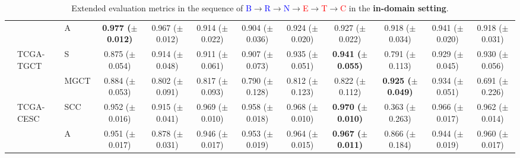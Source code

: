 \documentclass[10pt,twocolumn,letterpaper]{article}
\begin{document}
\begin{table}[h]
{{\begin{tabular}{lllcc|ccccc|cc}
          &            & A                   & \textbf{0.977 ($\pm$0.012)}  & 0.967 ($\pm$0.012)           & 0.914 ($\pm$0.022)        & 0.904 ($\pm$0.036)          & 0.924 ($\pm$0.020)          & 0.927 ($\pm$0.022)          & 0.918 ($\pm$0.034)          & 0.941 ($\pm$0.020)        & 0.918 ($\pm$0.031)        \\
          & TCGA-TGCT  & S & 0.875 ($\pm$0.054)           & 0.914 ($\pm$0.048)           & 0.911 ($\pm$0.061)        & 0.907 ($\pm$0.073)          & 0.935 ($\pm$0.051)          & \textbf{0.941 ($\pm$0.055)} & 0.791 ($\pm$0.113)          & 0.929 ($\pm$0.045)        & 0.930 ($\pm$0.056)        \\
          &            & MGCT            & 0.884 ($\pm$0.053)           & 0.802 ($\pm$0.091)           & 0.817 ($\pm$0.093)        & 0.790 ($\pm$0.128)          & 0.812 ($\pm$0.123)          & 0.822 ($\pm$0.112)          & \textbf{0.925 ($\pm$0.049)} & 0.934 ($\pm$0.051)        & 0.691 ($\pm$0.226)        \\
          & TCGA-CESC  & SCC          & 0.952 ($\pm$0.016)           & 0.915 ($\pm$0.041)           & 0.969 ($\pm$0.010)        & 0.958 ($\pm$0.018)          & 0.968 ($\pm$0.010)          & \textbf{0.970 ($\pm$0.010)} & 0.363 ($\pm$0.263)          & 0.966 ($\pm$0.017)        & 0.962 ($\pm$0.014)        \\
          &            & A                   & 0.951 ($\pm$0.017)           & 0.878 ($\pm$0.031)           & 0.946 ($\pm$0.017)        & 0.953 ($\pm$0.019)          & 0.964 ($\pm$0.015)          & \textbf{0.967 ($\pm$0.011)} & 0.866 ($\pm$0.184)          & 0.944 ($\pm$0.019)        & 0.960 ($\pm$0.017)       \\ \bottomrule
\end{tabular}}}
\caption{{Extended evaluation metrics in the sequence of \textcolor{blue}{B}$\rightarrow$\textcolor{blue}{R}$\rightarrow$\textcolor{blue}{N}$\rightarrow$\textcolor{red}{E}$\rightarrow$\textcolor{red}{T}$\rightarrow$\textcolor{red}{C} in the \textbf{in-domain setting}.}}
\label{tab:extended1}
\end{table}
\end{document}
